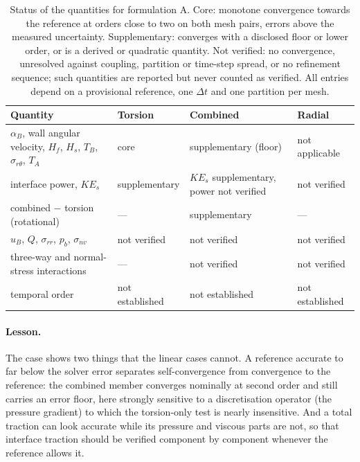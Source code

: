 \begin{table}[htbp]
	\centering
	\footnotesize
	\setlength{\tabcolsep}{3pt}
	\caption{Status of the quantities for formulation A. Core: monotone convergence towards the reference at orders close to two on both mesh pairs, errors above the measured uncertainty. Supplementary: converges with a disclosed floor or lower order, or is a derived or quadratic quantity. Not verified: no convergence, unresolved against coupling, partition or time-step spread, or no refinement sequence; such quantities are reported but never counted as verified. All entries depend on a provisional reference, one $\Delta t$ and one partition per mesh.}
	\label{tab:rot_scope}
	\begin{tabular}{p{4.6cm}p{2.5cm}p{3.2cm}p{2.4cm}}
		\toprule
		Quantity & Torsion & Combined & Radial \\
		\midrule
		$\alpha_B$, wall angular velocity, $H_f$, $H_s$, $T_B$, $\sigma_{r\theta}$, $T_A$ & core & supplementary (floor) & not applicable \\
		interface power, $KE_s$ & supplementary & $KE_s$ supplementary, power not verified & not verified \\
		combined $-$ torsion (rotational) & --- & supplementary & --- \\
		$u_B$, $Q$, $\sigma_{rr}$, $p_b$, $\sigma_{nv}$ & not verified & not verified & not verified \\
		three-way and normal-stress interactions & --- & not verified & not verified \\
		temporal order & not established & not established & not established \\
		\bottomrule
	\end{tabular}
\end{table}

\paragraph{Lesson.}
The case shows two things that the linear cases cannot.
A reference accurate to far below the solver error separates self-convergence from convergence to the reference: the combined member converges nominally at second order and still carries an error floor, here strongly sensitive to a discretisation operator (the pressure gradient) to which the torsion-only test is nearly insensitive.
And a total traction can look accurate while its pressure and viscous parts are not, so that interface traction should be verified component by component whenever the reference allows it.

